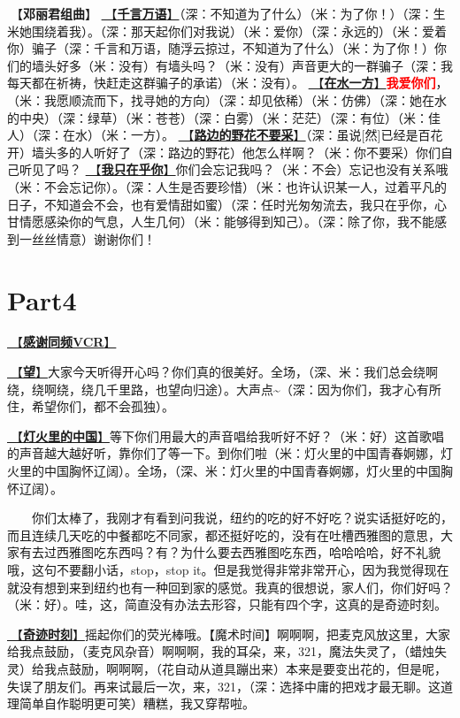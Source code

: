 \documentclass[]{ctexbook}
\begin{document}
🎵【\textbf{邓丽君组曲}】
\hyperref[thousands-of-words]{🎵【\textbf{千言万语}】}（深：不知道为了什么）（米：为了你！）（深：生米她围绕着我）。（深：那天起你们对我说）（米：爱你）（深：永远的）（米：爱着你）骗子（深：千言和万语，随浮云掠过，不知道为了什么）（米：为了你！）你们的墙头好多（米：没有）有墙头吗？（米：没有）声音更大的一群骗子（深：我每天都在祈祷，快赶走这群骗子的承诺）（米：没有）。
\hyperref[on-the-water-side]{🎵【\textbf{在水一方}】}\textbf{\textcolor{red}{我爱你们}}，（米：我愿顺流而下，找寻她的方向）（深：却见依稀）（米：仿佛）（深：她在水的中央）（深：绿草）（米：苍苍）（深：白雾）（米：茫茫）（深：有位）（米：佳人）（深：在水）（米：一方）。
\hyperref[only-with-me]{🎵【\textbf{路边的野花不要采}】}（深：虽说{[}然{]}已经是百花开）墙头多的人听好了（深：路边的野花）他怎么样啊？（米：你不要采）你们自己听见了吗？
\hyperref[only-you]{🎵【\textbf{我只在乎你}】}你们会忘记我吗？（米：不会）忘记也没有关系哦（米：不会忘记你）。（深：人生是否要珍惜）（米：也许认识某一人，过着平凡的日子，不知道会不会，也有爱情甜如蜜）（深：任时光匆匆流去，我只在乎你，心甘情愿感染你的气息，人生几何）（米：能够得到知己）。（深：除了你，我不能感到一丝丝情意）谢谢你们！

\section{Part4}\label{NewYork-20250309-part4}

\hyperref[thank-you-vcr]{🎥【\textbf{感谢同频VCR}】}

\hyperref[Gaze]{🎵【\textbf{望}】}大家今天听得开心吗？你们真的很美好。全场，（深、米：我们总会绕啊绕，绕啊绕，绕几千里路，也望向归途）。大声点\textasciitilde（深：因为你们，我才心有所住，希望你们，都不会孤独）。

\hyperref[China-in-the-lights]{🎵【\textbf{灯火里的中国}】}等下你们用最大的声音唱给我听好不好？（米：好）这首歌唱的声音越大越好听，靠你们了等一下。到你们啦（米：灯火里的中国青春婀娜，灯火里的中国胸怀辽阔）。全场，（深、米：灯火里的中国青春婀娜，灯火里的中国胸怀辽阔）。

  你们太棒了，我刚才有看到问我说，纽约的吃的好不好吃？说实话挺好吃的，而且连续几天吃的中餐都吃不同家，都还挺好吃的，没有在吐槽西雅图的意思，大家有去过西雅图吃东西吗？有？为什么要去西雅图吃东西，哈哈哈哈，好不礼貌哦，这句不要翻小话，stop，stop it。但是我觉得非常非常开心，因为我觉得现在就没有想到来到纽约也有一种回到家的感觉。我真的很想说，家人们，你们好吗？（米：好）。哇，这，简直没有办法去形容，只能有四个字，这真的是奇迹时刻。

\hyperref[magic-moment]{🎵【\textbf{奇迹时刻}】}摇起你们的荧光棒哦。【魔术时间】啊啊啊，把麦克风放这里，大家给我点鼓励，（麦克风杂音）啊啊啊，我的耳朵，来，321，魔法失灵了，（蜡烛失灵）给我点鼓励，啊啊啊，（花自动从道具蹦出来）本来是要变出花的，但是呢，失误了朋友们。再来试最后一次，来，321，（深：选择中庸的把戏才最无聊。这道理简单自作聪明更可笑）糟糕，我又穿帮啦。
\end{document}
